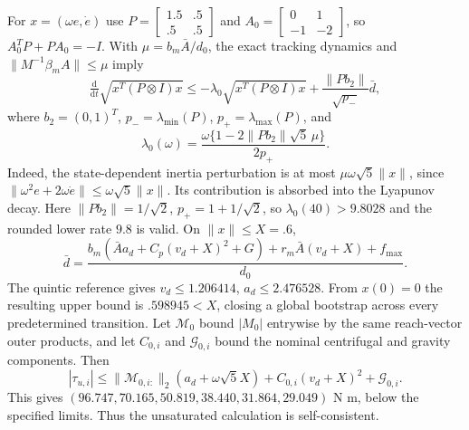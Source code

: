 For $x=(\omega e,\dot e)$ use $P=\left[\begin{smallmatrix}1.5&.5\\.5&.5\end{smallmatrix}\right]$ and $A_0=\left[\begin{smallmatrix}0&1\\-1&-2\end{smallmatrix}\right]$, so $A_0^TP+PA_0=-I$. With $\mu=b_m\bar A/d_0$, the exact tracking dynamics and $\|M^{-1}\beta_m A\|\le\mu$ imply
\begin{equation}
 \tfrac{\mathrm d}{\mathrm dt}\sqrt{x^T(P\otimes I)x}
 \le-\lambda_0\sqrt{x^T(P\otimes I)x}
       +\frac{\|Pb_2\|}{\sqrt{p_-}}\bar d,
\end{equation}
where $b_2=(0,1)^T$, $p_-=\lambda_{\min}(P)$, $p_+=\lambda_{\max}(P)$, and
\begin{equation}
 \lambda_0(\omega)=\frac{\omega\{1-2\|Pb_2\|\sqrt5\,\mu\}}{2p_+}.
 \label{eq:lambda_control}
\end{equation}
Indeed, the state-dependent inertia perturbation is at most $\mu\omega\sqrt5\|x\|$, since $\|\omega^2e+2\omega\dot e\|\le\omega\sqrt5\|x\|$. Its contribution is absorbed into the Lyapunov decay. Here $\|Pb_2\|=1/\sqrt2$, $p_+=1+1/\sqrt2$, so $\lambda_0(40)>9.8028$ and the rounded lower rate $9.8$ is valid. On $\|x\|\le X=.6$,
\begin{equation}
 \bar d=\frac{b_m(\bar A a_d+C_p(v_d+X)^2+G)+r_m\bar A(v_d+X)+f_{\max}}{d_0}.
\end{equation}
The quintic reference gives $v_d\le1.206414$, $a_d\le2.476528$. From $x(0)=0$ the resulting upper bound is $.598945<X$, closing a global bootstrap across every predetermined transition. Let $\mathcal M_0$ bound $|M_0|$ entrywise by the same reach-vector outer products, and let $C_{0,i}$ and $\mathcal G_{0,i}$ bound the nominal centrifugal and gravity components. Then
\begin{equation}
 |\tau_{u,i}|\le\|\mathcal M_{0,i:}\|_2(a_d+\omega\sqrt5X)
 +C_{0,i}(v_d+X)^2+\mathcal G_{0,i}.
\end{equation}
This gives $(96.747,70.165,50.819,38.440,31.864,29.049)$ N m, below the specified limits. Thus the unsaturated calculation is self-consistent.

